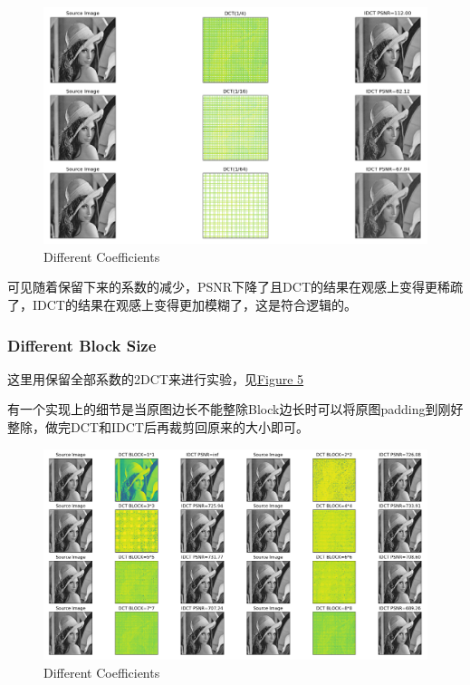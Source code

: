 \documentclass[UTF8]{ctexart}
\begin{document}
	\begin{figure}[htbp]
		\centering
		\includegraphics[width=1.0\textwidth]{../part1-2.png}
		\caption{Different Coefficients}
		\label{Fig.part1-2}
	\end{figure}

	可见随着保留下来的系数的减少，PSNR下降了且DCT的结果在观感上变得更稀疏了，IDCT的结果在观感上变得更加模糊了，这是符合逻辑的。
	
	\subsubsection{Different Block Size}
	
	这里用保留全部系数的2DCT来进行实验，见\hyperref[Fig.part1-3-1]{Figure 5}
	
	有一个实现上的细节是当原图边长不能整除Block边长时可以将原图padding到刚好整除，做完DCT和IDCT后再裁剪回原来的大小即可。
	
	\begin{figure}[htbp]
		\centering
		\includegraphics[width=1.0\textwidth]{../part1-3-1.png}
		\caption{Different Coefficients}
		\label{Fig.part1-3-1}
	\end{figure}
\end{document}
